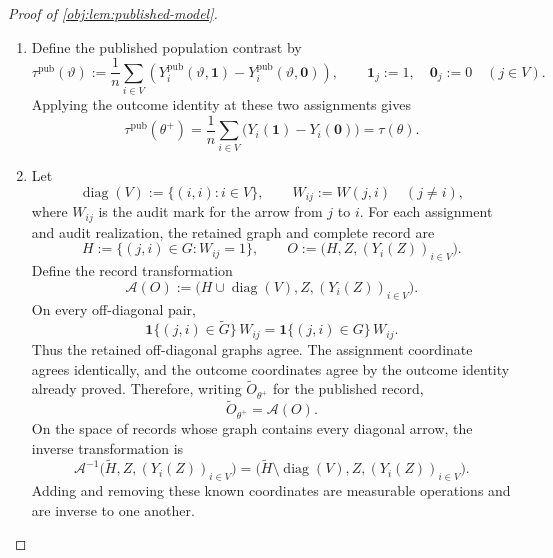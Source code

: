 \begin{proof}[Proof of \cref{obj:lem:published-model}]
\begin{enumerate}
\item Define the published population contrast by
\[
\tau^{\mathrm{pub}}(\vartheta)
:=
\frac1n\sum_{i\in V}
\left(
Y_i^{\mathrm{pub}}(\vartheta,\mathbf1)
-Y_i^{\mathrm{pub}}(\vartheta,\mathbf0)
\right),
\qquad
\mathbf1_j:=1,\quad \mathbf0_j:=0
\quad(j\in V).
\]
Applying the outcome identity at these two assignments gives
\[
\tau^{\mathrm{pub}}(\theta^+)
=
\frac1n\sum_{i\in V}\bigl(Y_i(\mathbf1)-Y_i(\mathbf0)\bigr)
=\tau(\theta).
\]

\item Let
\[
\operatorname{diag}(V):=\{(i,i):i\in V\},
\qquad
W_{ij}:=W(j,i)\quad(j\ne i),
\]
where \(W_{ij}\) is the audit mark for the arrow from \(j\) to \(i\).
For each assignment and audit realization, the retained graph and complete record are
\[
H:=\{(j,i)\in G:W_{ij}=1\},
\qquad
O:=\bigl(H,Z,(Y_i(Z))_{i\in V}\bigr).
\]
Define the record transformation
\[
\mathcal A(O)
:=
\bigl(H\cup\operatorname{diag}(V),Z,(Y_i(Z))_{i\in V}\bigr).
\]
On every off-diagonal pair,
\[
\mathbf1\{(j,i)\in\widetilde G\}\,W_{ij}
=
\mathbf1\{(j,i)\in G\}\,W_{ij}.
\]
Thus the retained off-diagonal graphs agree. The assignment coordinate agrees identically, and the outcome coordinates agree by the outcome identity already proved. Therefore, writing \(\widetilde O_{\theta^+}\) for the published record,
\[
\widetilde O_{\theta^+}=\mathcal A(O).
\]
On the space of records whose graph contains every diagonal arrow, the inverse transformation is
\[
\mathcal A^{-1}
\bigl(\widetilde H,Z,(Y_i(Z))_{i\in V}\bigr)
=
\bigl(\widetilde H\setminus\operatorname{diag}(V),
Z,(Y_i(Z))_{i\in V}\bigr).
\]
Adding and removing these known coordinates are measurable operations and are inverse to one another.


\end{enumerate}
\end{proof}
